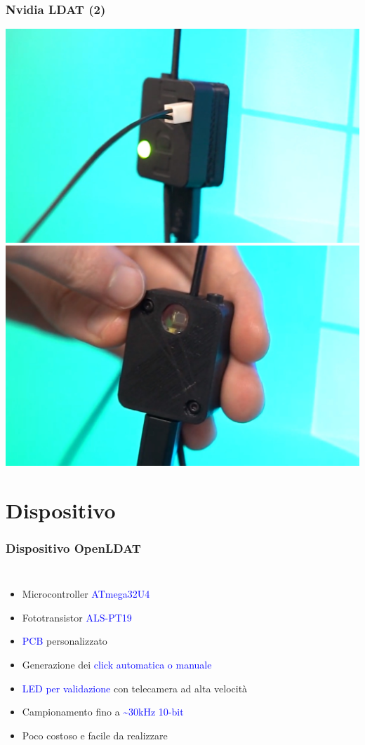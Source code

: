 \documentclass{beamer}
\begin{document}
\begin{frame}
	\frametitle{Nvidia LDAT (2)}
	\centering
	\includegraphics[height=0.45\textheight]{StatoDellArte_files/nvldat_front.jpg}
	\includegraphics[height=0.45\textheight]{StatoDellArte_files/nvldat_back.jpg}
\end{frame}

\section{Dispositivo}
\begin{frame}
\frametitle{Dispositivo OpenLDAT}
\begin{columns}
	\begin{itemize}
		\item Microcontroller \textcolor{blue}{ATmega32U4}
		\item Fototransistor \textcolor{blue}{ALS-PT19}
		\item \textcolor{blue}{PCB} personalizzato
		\item Generazione dei \textcolor{blue}{click automatica o manuale}
		\item \textcolor{blue}{LED per validazione} con telecamera ad alta velocità
		\item Campionamento fino a \textcolor{blue}{\textasciitilde 30kHz 10-bit}
		\item Poco costoso e facile da realizzare
	\end{itemize}
\end{columns}
\end{frame}
\end{document}
